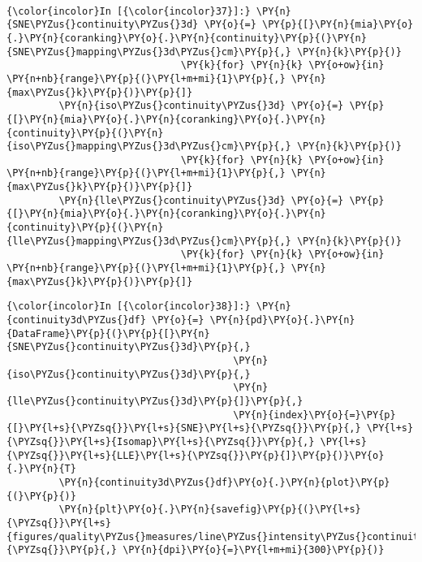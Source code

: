     \begin{center}
    \end{center}
    { \hspace*{\fill} \\}

    \begin{Verbatim}[commandchars=\\\{\}]
{\color{incolor}In [{\color{incolor}37}]:} \PY{n}{SNE\PYZus{}continuity\PYZus{}3d} \PY{o}{=} \PY{p}{[}\PY{n}{mia}\PY{o}{.}\PY{n}{coranking}\PY{o}{.}\PY{n}{continuity}\PY{p}{(}\PY{n}{SNE\PYZus{}mapping\PYZus{}3d\PYZus{}cm}\PY{p}{,} \PY{n}{k}\PY{p}{)}
                              \PY{k}{for} \PY{n}{k} \PY{o+ow}{in} \PY{n+nb}{range}\PY{p}{(}\PY{l+m+mi}{1}\PY{p}{,} \PY{n}{max\PYZus{}k}\PY{p}{)}\PY{p}{]}
         \PY{n}{iso\PYZus{}continuity\PYZus{}3d} \PY{o}{=} \PY{p}{[}\PY{n}{mia}\PY{o}{.}\PY{n}{coranking}\PY{o}{.}\PY{n}{continuity}\PY{p}{(}\PY{n}{iso\PYZus{}mapping\PYZus{}3d\PYZus{}cm}\PY{p}{,} \PY{n}{k}\PY{p}{)}
                              \PY{k}{for} \PY{n}{k} \PY{o+ow}{in} \PY{n+nb}{range}\PY{p}{(}\PY{l+m+mi}{1}\PY{p}{,} \PY{n}{max\PYZus{}k}\PY{p}{)}\PY{p}{]}
         \PY{n}{lle\PYZus{}continuity\PYZus{}3d} \PY{o}{=} \PY{p}{[}\PY{n}{mia}\PY{o}{.}\PY{n}{coranking}\PY{o}{.}\PY{n}{continuity}\PY{p}{(}\PY{n}{lle\PYZus{}mapping\PYZus{}3d\PYZus{}cm}\PY{p}{,} \PY{n}{k}\PY{p}{)}
                              \PY{k}{for} \PY{n}{k} \PY{o+ow}{in} \PY{n+nb}{range}\PY{p}{(}\PY{l+m+mi}{1}\PY{p}{,} \PY{n}{max\PYZus{}k}\PY{p}{)}\PY{p}{]}
\end{Verbatim}

    \begin{Verbatim}[commandchars=\\\{\}]
{\color{incolor}In [{\color{incolor}38}]:} \PY{n}{continuity3d\PYZus{}df} \PY{o}{=} \PY{n}{pd}\PY{o}{.}\PY{n}{DataFrame}\PY{p}{(}\PY{p}{[}\PY{n}{SNE\PYZus{}continuity\PYZus{}3d}\PY{p}{,}
                                       \PY{n}{iso\PYZus{}continuity\PYZus{}3d}\PY{p}{,}
                                       \PY{n}{lle\PYZus{}continuity\PYZus{}3d}\PY{p}{]}\PY{p}{,}
                                       \PY{n}{index}\PY{o}{=}\PY{p}{[}\PY{l+s}{\PYZsq{}}\PY{l+s}{SNE}\PY{l+s}{\PYZsq{}}\PY{p}{,} \PY{l+s}{\PYZsq{}}\PY{l+s}{Isomap}\PY{l+s}{\PYZsq{}}\PY{p}{,} \PY{l+s}{\PYZsq{}}\PY{l+s}{LLE}\PY{l+s}{\PYZsq{}}\PY{p}{]}\PY{p}{)}\PY{o}{.}\PY{n}{T}
         \PY{n}{continuity3d\PYZus{}df}\PY{o}{.}\PY{n}{plot}\PY{p}{(}\PY{p}{)}
         \PY{n}{plt}\PY{o}{.}\PY{n}{savefig}\PY{p}{(}\PY{l+s}{\PYZsq{}}\PY{l+s}{figures/quality\PYZus{}measures/line\PYZus{}intensity\PYZus{}continuity\PYZus{}3d.png}\PY{l+s}{\PYZsq{}}\PY{p}{,} \PY{n}{dpi}\PY{o}{=}\PY{l+m+mi}{300}\PY{p}{)}
\end{Verbatim}

